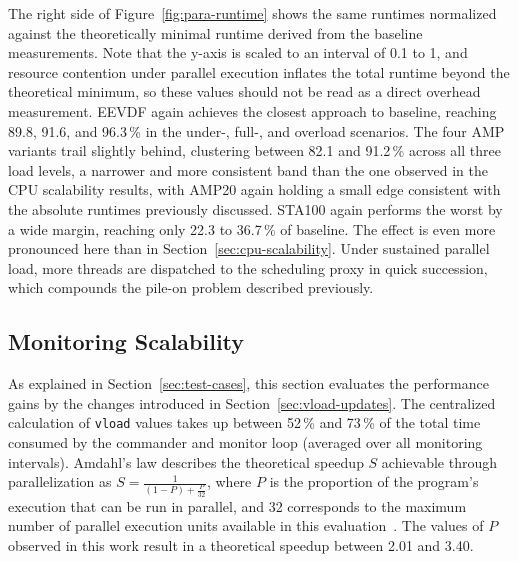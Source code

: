 The right side of Figure~\ref{fig:para-runtime} shows the same runtimes normalized against the theoretically minimal runtime derived from the baseline measurements.
Note that the y-axis is scaled to an interval of 0.1 to 1, and resource contention under parallel execution inflates the total runtime beyond the theoretical minimum, so these values should not be read as a direct overhead measurement.
EEVDF again achieves the closest approach to baseline, reaching 89.8, 91.6, and 96.3\,\% in the under-, full-, and overload scenarios.
The four AMP variants trail slightly behind, clustering between 82.1 and 91.2\,\% across all three load levels, a narrower and more consistent band than the one observed in the CPU scalability results, with AMP20 again holding a small edge consistent with the absolute runtimes previously discussed.
STA100 again performs the worst by a wide margin, reaching only 22.3 to 36.7\,\% of baseline.
The effect is even more pronounced here than in Section~\ref{sec:cpu-scalability}.
Under sustained parallel load, more threads are dispatched to the scheduling proxy in quick succession, which compounds the pile-on problem described previously.

\subsection{Monitoring Scalability}
\label{sec:overhead-analysis}

As explained in Section~\ref{sec:test-cases}, this section evaluates the performance gains by the changes introduced in Section~\ref{sec:vload-updates}.
The centralized calculation of \texttt{vload} values takes up between 52\,\% and 73\,\% of the total time consumed by the commander and monitor loop (averaged over all monitoring intervals).
Amdahl's law describes the theoretical speedup $S$ achievable through parallelization as $S = \frac{1}{(1-P)+\frac{P}{32}}$, where $P$ is the proportion of the program's execution that can be run in parallel, and 32 corresponds to the maximum number of parallel execution units available in this evaluation~\cite{amdahls_law}.
The values of $P$ observed in this work result in a theoretical speedup between 2.01 and 3.40.

